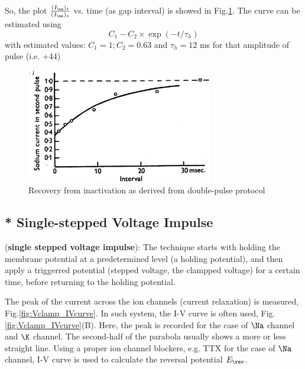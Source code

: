 So, the plot $\frac{(I_\na)_{t}}{(I_\na)_o}$ vs. time (as gap interval) is
showed in Fig.\ref{fig:inactivation-tau-h-double-pulse}. The curve can be
estimated using
\begin{equation}
C_1 - C_2 \times \exp\left( -t/\tau_h\right)
\end{equation}
with estimated values: $C_1 = 1; C_2 = 0.63$ and $\tau_h = 12 $ ms for that
amplitude of pulse (i.e. +44)

\begin{figure}[htb]
  \centerline{\includegraphics[height=5cm,
  angle=0]{./images/inactivation-tau-h-double-pulse.eps}}
  \caption{Recovery from  inactivation as derived from
  double-pulse protocol}\label{fig:inactivation-tau-h-double-pulse}
\end{figure}


\subsection{* Single-stepped Voltage Impulse}
\label{sec:voltage-clamp-single-pulse}

({\bf single stepped voltage impulse}):
The technique starts with holding the membrane potential at a predetermined
level (a holding potential), and then apply a triggerred
potential (stepped voltage, the clampped voltage) for a certain time, before
returning to the holding potential.

The peak of the current across the ion channels (current relaxation) is
measured, Fig.\ref{fig:Vclamp_IVcurve}.
In such system, the I-V curve is often used, Fig.\ref{fig:Vclamp_IVcurve}(B).
Here, the peak is recorded for the case of $\Na$ channel and $\K$ channel. The
second-half of the parabola usually shows a more or less straight line. Using a
proper ion channel blockers, e.g. TTX for the case of $\Na$ channel, I-V curve
is used to calculate the reversal potential $E_\rev$. 
 
